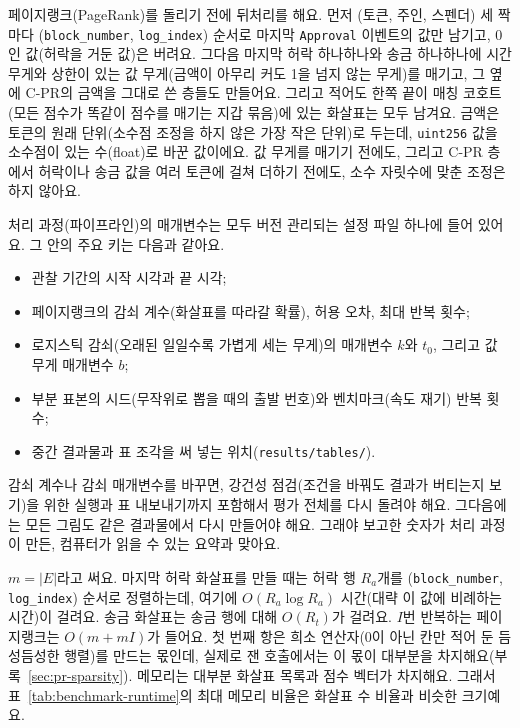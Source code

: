 페이지랭크(PageRank)를 돌리기 전에 뒤처리를 해요. 먼저 (토큰, 주인, 스펜더) 세 짝마다 (\texttt{block\_number}, \texttt{log\_index}) 순서로 마지막 \texttt{Approval} 이벤트의 값만 남기고, 0인 값(허락을 거둔 값)은 버려요. 그다음 마지막 허락 하나하나와 송금 하나하나에 시간 무게와 상한이 있는 값 무게(금액이 아무리 커도 1을 넘지 않는 무게)를 매기고, 그 옆에 C-PR의 금액을 그대로 쓴 층들도 만들어요. 그리고 적어도 한쪽 끝이 매칭 코호트(모든 점수가 똑같이 점수를 매기는 지갑 묶음)에 있는 화살표는 모두 남겨요. 금액은 토큰의 원래 단위(소수점 조정을 하지 않은 가장 작은 단위)로 두는데, \texttt{uint256} 값을 소수점이 있는 수(float)로 바꾼 값이에요. 값 무게를 매기기 전에도, 그리고 C-PR 층에서 허락이나 송금 값을 여러 토큰에 걸쳐 더하기 전에도, 소수 자릿수에 맞춘 조정은 하지 않아요.


처리 과정(파이프라인)의 매개변수는 모두 버전 관리되는 설정 파일 하나에 들어 있어요. 그 안의 주요 키는 다음과 같아요.

\begin{itemize}
\item 관찰 기간의 시작 시각과 끝 시각;
\item 페이지랭크의 감쇠 계수(화살표를 따라갈 확률), 허용 오차, 최대 반복 횟수;
\item 로지스틱 감쇠(오래된 일일수록 가볍게 세는 무게)의 매개변수 $k$와 $t_0$, 그리고 값 무게 매개변수 $b$;
\item 부분 표본의 시드(무작위로 뽑을 때의 출발 번호)와 벤치마크(속도 재기) 반복 횟수;
\item 중간 결과물과 표 조각을 써 넣는 위치(\texttt{results/tables/}).
\end{itemize}

감쇠 계수나 감쇠 매개변수를 바꾸면, 강건성 점검(조건을 바꿔도 결과가 버티는지 보기)을 위한 실행과 표 내보내기까지 포함해서 평가 전체를 다시 돌려야 해요. 그다음에는 모든 그림도 같은 결과물에서 다시 만들어야 해요. 그래야 보고한 숫자가 처리 과정이 만든, 컴퓨터가 읽을 수 있는 요약과 맞아요.


$m=|E|$라고 써요. 마지막 허락 화살표를 만들 때는 허락 행 $R_a$개를 (\texttt{block\_number}, \texttt{log\_index}) 순서로 정렬하는데, 여기에 $O(R_a\log R_a)$ 시간(대략 이 값에 비례하는 시간)이 걸려요. 송금 화살표는 송금 행에 대해 $O(R_t)$가 걸려요. $I$번 반복하는 페이지랭크는 $O(m+mI)$가 들어요. 첫 번째 항은 희소 연산자(0이 아닌 칸만 적어 둔 듬성듬성한 행렬)를 만드는 몫인데, 실제로 잰 호출에서는 이 몫이 대부분을 차지해요(부록~\ref{sec:pr-sparsity}). 메모리는 대부분 화살표 목록과 점수 벡터가 차지해요. 그래서 표~\ref{tab:benchmark-runtime}의 최대 메모리 비율은 화살표 수 비율과 비슷한 크기예요.

